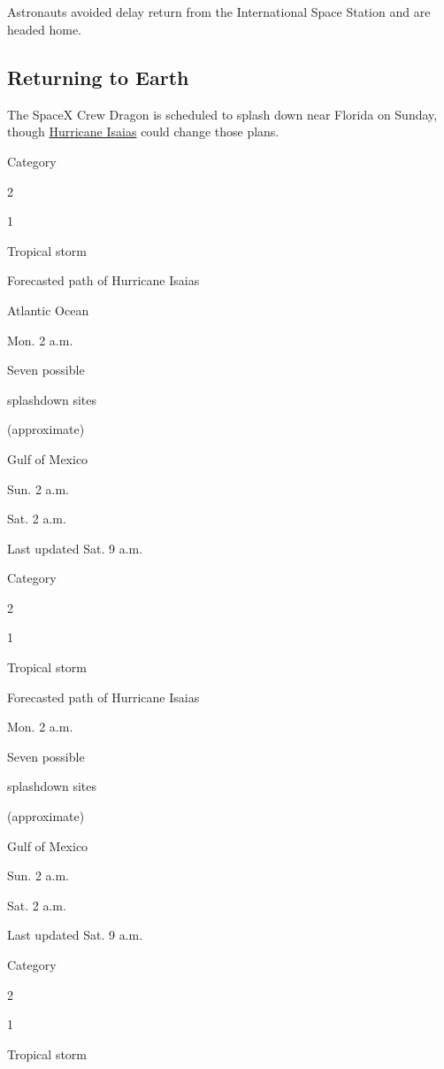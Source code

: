 \hypertarget{-5}{%
\subsection{}\label{-5}}

Astronauts avoided delay return from the International Space Station and
are headed home.

\hypertarget{returning-to-earth}{%
\subsection{Returning to Earth}\label{returning-to-earth}}

The SpaceX Crew Dragon is scheduled to splash down near Florida on
Sunday, though
\href{https://www.nytimes.com/interactive/2020/07/31/us/hurricane-isaias-tracker-map.html}{Hurricane
Isaias} could change those plans.

Category

2

1

Tropical storm

Forecasted path of Hurricane Isaias

Atlantic Ocean

Mon. 2 a.m.

Seven possible

splashdown sites

(approximate)

Gulf of Mexico

Sun. 2 a.m.

Sat. 2 a.m.

Last updated Sat. 9 a.m.

Category

2

1

Tropical storm

Forecasted path of Hurricane Isaias

Mon. 2 a.m.

Seven possible

splashdown sites

(approximate)

Gulf of Mexico

Sun. 2 a.m.

Sat. 2 a.m.

Last updated Sat. 9 a.m.

Category

2

1

Tropical storm

